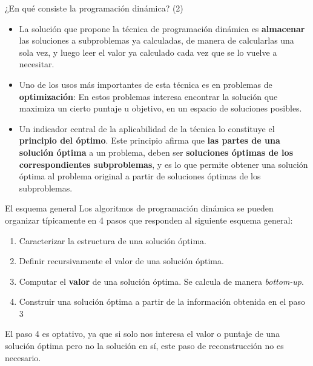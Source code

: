 \documentclass[compress]{beamer}
\begin{document}
\begin{frame}{¿En qué consiste la programación dinámica? (2)}
  \begin{itemize}
   \item La solución que propone la técnica de programación dinámica es \textbf{almacenar} las soluciones a subproblemas ya calculadas, de
   manera de calcularlas una sola vez, y luego leer el valor ya calculado cada vez que se lo vuelve a necesitar.
   \item Uno de los usos más importantes de esta técnica es en problemas de \textbf{optimización}: En estos problemas interesa
   encontrar la solución que maximiza un cierto puntaje u objetivo, en un espacio de soluciones posibles.
   \item Un indicador central de la aplicabilidad de la técnica lo constituye el \textbf{principio del óptimo}. Este principio afirma
    que \textbf{las partes de una solución óptima} a un problema, deben ser \textbf{soluciones óptimas de los correspondientes subproblemas}, y es lo que
    permite obtener una solución óptima al problema original a partir de soluciones óptimas de los subproblemas.
  \end{itemize}
    
\end{frame}

\begin{frame}{El esquema general}
    Los algoritmos de programación dinámica se pueden organizar típicamente en 4 pasos que responden al siguiente esquema general:
   \begin{enumerate}
   \item Caracterizar la estructura de una solución óptima.
   \item Definir recursivamente el valor de una solución óptima.
   \item Computar el \textbf{valor} de una solución óptima. Se calcula de manera \textit{bottom-up}.
   \item Construir una solución óptima a partir de la información obtenida en el paso 3
  \end{enumerate}
    El paso 4 es optativo, ya que si solo nos interesa el valor o puntaje de una solución óptima pero no la solución en sí, este paso
    de reconstrucción no es necesario.
\end{frame}
\end{document}
